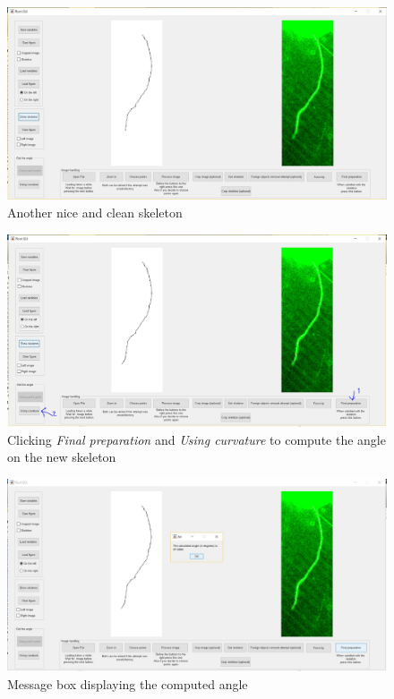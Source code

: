 \begin{figure}[H]
	\centering
	\includegraphics[width=\textwidth]{../Figures/manual/optionalD5.jpg}
	\caption{Another nice and clean skeleton}
	\label{fig:img59}
\end{figure}

\begin{figure}[H]
	\centering
	\includegraphics[width=\textwidth]{../Figures/manual/optionalD6.jpg}
	\caption{Clicking \textit{Final preparation} and \textit{Using curvature} to compute the angle on the new skeleton}
	\label{fig:img60}
\end{figure}

\begin{figure}[H]
	\centering
	\includegraphics[width=\textwidth]{../Figures/manual/optionalD7.jpg}
	\caption{Message box displaying the computed angle}
	\label{fig:img61}
\end{figure}


